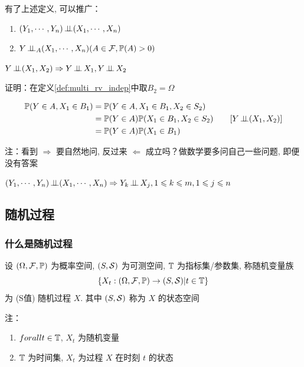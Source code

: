有了上述定义, 可以推广：

\begin{enumerate}
    \item $(Y_1,\cdots,Y_n)\operatorname{\perp\!\!\!\perp} (X_1,\cdots,X_n)$
    \item $Y\operatorname{\perp\!\!\!\perp}_A (X_1,\cdots,X_n) (A\in \mathcal{F},\mathbb{P}(A)>0)$
\end{enumerate}

\begin{property}\label{prop:pairwise_indep}
    $Y\ind (X_1,X_2)\Rightarrow Y\ind X_1,Y\ind X_2$
\end{property}

证明：在定义\ref{def:multi_rv_indep}中取$B_2=\Omega$

\[
\begin{aligned}
    \mathbb{P}(Y\in A,X_1\in B_1)&=\mathbb{P}(Y\in A,X_1\in B_1,X_2\in S_2)\\
    &=\mathbb{P}(Y\in A)\mathbb{P}(X_1\in B_1,X_2\in S_2)\qquad [Y\operatorname{\perp\!\!\!\perp} (X_1,X_2)]\\
    &=\mathbb{P}(Y\in A)\mathbb{P}(X_1\in B_1)
\end{aligned}
\]

注：看到 $\Rightarrow$ 要自然地问, 反过来 $\Leftarrow$ 成立吗？做数学要多问自己一些问题, 即便没有答案

\begin{corollary}
    $(Y_1,\cdots,Y_n)\operatorname{\perp\!\!\!\perp} (X_1,\cdots,X_n)\Rightarrow Y_k\operatorname{\perp\!\!\!\perp} X_j, 1\leqslant k\leqslant m,1\leqslant j\leqslant n$
\end{corollary}

\subsection{随机过程}

\subsubsection{什么是随机过程}

\begin{definition}[随机过程]
    设 $(\Omega, \mathcal{F}, \mathbb{P})$ 为概率空间, $(S,\mathcal{S})$ 为可测空间, $\mathbb{T}$ 为指标集/参数集, 称随机变量族
    \[
    \{X_t: (\Omega,\mathcal{F},\mathbb{P})\rightarrow (S,\mathcal{S})|t\in \mathbb{T}\}
    \]
    为 (S值) 随机过程 $X$. 其中 $(S,\mathcal{S})$ 称为 $X$ 的状态空间

    注：\begin{enumerate}
        \item $forall t\in \mathbb{T}$, $X_t$ 为随机变量
        \item $\mathbb{T}$ 为时间集, $X_t$ 为过程 $X$ 在时刻 $t$ 的状态
    \end{enumerate}
\end{definition}


